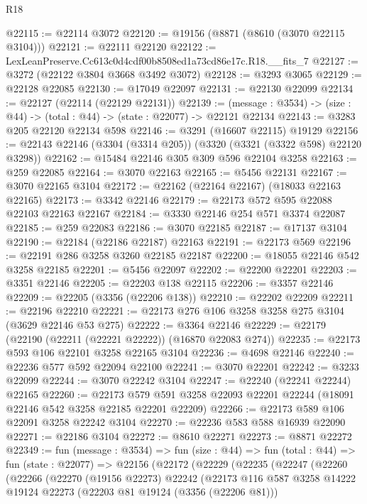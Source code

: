\begin{lexlean}{R18}
\begin{coremodule}
@22115 := @22114 @3072
@22120 := @19156 (@8871 (@8610 (@3070 @22115 @3104)))
@22121 := @22111 @22120
@22122 := LexLeanPreserve.Cc613c0d4cdf00b8508ed1a73cd86e17c.R18.__fits_7
@22127 := @3272 (@22122 @3804 @3668 @3492 @3072)
@22128 := @3293 @3065
@22129 := @22128 @22085
@22130 := @17049 @22097
@22131 := @22130 @22099
@22134 := @22127 (@22114 (@22129 @22131))
@22139 := (message : @3534) -> (size : @44) -> (total : @44) -> (state : @22077) -> @22121 @22134
@22143 := @3283 @205 @22120 @22134 @598
@22146 := @3291 (@16607 @22115) @19129
@22156 := @22143 @22146 (@3304 (@3314 @205)) (@3320 (@3321 (@3322 @598) @22120 @3298))
@22162 := @15484 @22146 @305 @309 @596 @22104 @3258
@22163 := @259 @22085
@22164 := @3070 @22163
@22165 := @5456 @22131
@22167 := @3070 @22165 @3104
@22172 := @22162 (@22164 @22167) (@18033 @22163 @22165)
@22173 := @3342 @22146
@22179 := @22173 @572 @595 @22088 @22103 @22163 @22167
@22184 := @3330 @22146 @254 @571 @3374 @22087
@22185 := @259 @22083
@22186 := @3070 @22185
@22187 := @17137 @3104
@22190 := @22184 (@22186 @22187) @22163
@22191 := @22173 @569
@22196 := @22191 @286 @3258 @3260 @22185 @22187
@22200 := @18055 @22146 @542 @3258 @22185
@22201 := @5456 @22097
@22202 := @22200 @22201
@22203 := @3351 @22146
@22205 := @22203 @138 @22115
@22206 := @3357 @22146
@22209 := @22205 (@3356 (@22206 @138))
@22210 := @22202 @22209
@22211 := @22196 @22210
@22221 := @22173 @276 @106 @3258 @3258 @275 @3104 (@3629 @22146 @53 @275)
@22222 := @3364 @22146
@22229 := @22179 (@22190 (@22211 (@22221 @22222)) (@16870 @22083 @274))
@22235 := @22173 @593 @106 @22101 @3258 @22165 @3104
@22236 := @4698 @22146
@22240 := @22236 @577 @592 @22094 @22100
@22241 := @3070 @22201
@22242 := @3233 @22099
@22244 := @3070 @22242 @3104
@22247 := @22240 (@22241 @22244) @22165
@22260 := @22173
    @579
    @591
    @3258
    @22093
    @22201
    @22244
    (@18091 @22146 @542 @3258 @22185 @22201 @22209)
@22266 := @22173 @589 @106 @22091 @3258 @22242 @3104
@22270 := @22236 @583 @588 @16939 @22090
@22271 := @22186 @3104
@22272 := @8610 @22271
@22273 := @8871 @22272
@22349 := fun (message : @3534) =>
  fun (size : @44) =>
  fun (total : @44) =>
  fun (state : @22077) =>
  @22156
    (@22172
      (@22229
        (@22235
          (@22247
            (@22260
              (@22266
                (@22270
                  (@19156 @22273)
                  @22242
                  (@22173
                    @116
                    @587
                    @3258
                    @14222
                    @19124
                    @22273
                    (@22203 @81 @19124 (@3356 (@22206 @81)))

\end{coremodule}
\end{lexlean}
